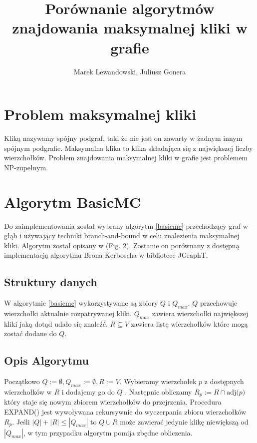 \documentclass[12pt, a4paper]{article}
\author{Marek Lewandowski, Juliusz Gonera}
\date{}
\title{Porównanie algorytmów znajdowania maksymalnej kliki w grafie}
\begin{document}
\maketitle

\section{Problem maksymalnej kliki}
\label{sec-1}
Kliką nazywamy spójny podgraf, taki że nie jest on zawarty w żadnym innym spójnym podgrafie. Maksymalna klika to klika składająca się z największej liczby wierzchołków. Problem znajdowania maksymalnej kliki w grafie jest problemem NP-zupełnym.

\section{Algorytm BasicMC}
\label{sec-2}
Do zaimplementowania został wybrany algorytm \ref{basicmc} przechodzący graf w głąb i używający techniki branch-and-bound w celu znalezienia maksymalnej kliki. Algorytm został opisany w \citep{bioinf} (Fig. 2). Zostanie on porównany z dostępną implementacją algorytmu Brona-Kerboscha w bibliotece JGraphT\citep{jgrapht}.

\subsection{Struktury danych}

W algorytmie \ref{basicmc} wykorzystywane są zbiory $Q$ i $Q_{max}$. $Q$ przechowuje wierzchołki aktualnie rozpatrywanej kliki. $Q_{max}$ zawiera wierzchołki największej kliki jaką dotąd udało się znaleźć. $R \subseteq V $ zawiera listę wierzchołków które mogą zostać dodane do $Q$.

\subsection{Opis Algorytmu}

Początkowo $Q := \emptyset, Q_{max} := \emptyset, R := V$. Wybieramy wierzchołek $p$ z dostępnych wierzchołków w $R$ i dodajemy go do $Q$ . Następnie obliczamy $R_{p} := R \cap \text{adj(}p\text{)}$ który staje się nowym zbiorem wierzchołków do przejrzenia. Procedura EXPAND() jest wywoływana rekursywnie do wyczerpania zbioru wierzchołków $R_{p}$. Jeśli $|Q|+|R| \leq |Q_{max}|$ to $Q \cup R$ może zawierać jedynie klikę niewiększą od $|Q_{max}|$, w tym przypadku algorytm pomija zbędne obliczenia.
\end{document}
